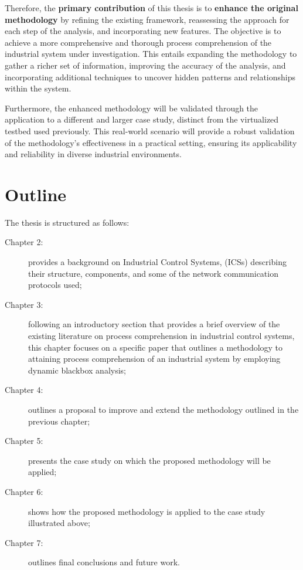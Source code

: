 \bigskip
Therefore, the \textbf{primary contribution} of this thesis is to \textbf{enhance the original methodology} by refining the existing framework, reassessing the approach for each step of the analysis, and incorporating new features. The objective is to achieve a more comprehensive and thorough process comprehension of the industrial system under investigation. This entails expanding the methodology to gather a richer set of information, improving the accuracy of the analysis, and incorporating additional techniques to uncover hidden patterns and relationships within the system.

\bigskip
Furthermore, the enhanced methodology will be validated through the application to a different and larger case study, distinct from the virtualized testbed used previously. This real-world scenario will provide a robust validation of the methodology's effectiveness in a practical setting, ensuring its applicability and reliability in diverse industrial environments. 

\section{Outline}
\label{sec:1_outline}
\noindent The thesis is structured as follows:

\begin{description}
	\item [Chapter 2:] provides a background on Industrial Control Systems, (ICSs) describing their structure, components, and some of the network communication protocols used;
	\item [Chapter 3:] following an introductory section that provides a brief overview of the existing literature on process comprehension in industrial control systems, this chapter focuses on a specific paper that outlines a methodology to attaining process comprehension of an industrial system by employing dynamic blackbox analysis;
	\item [Chapter 4:] outlines a proposal to improve and extend the methodology outlined in the previous chapter;
	\item [Chapter 5:] presents the case study on which the proposed methodology will be applied;
	\item [Chapter 6:] shows how the proposed methodology is applied to the case study illustrated above;
	\item [Chapter 7:] outlines final conclusions and future work.
\end{description}

\vfill
\nolinenumbers